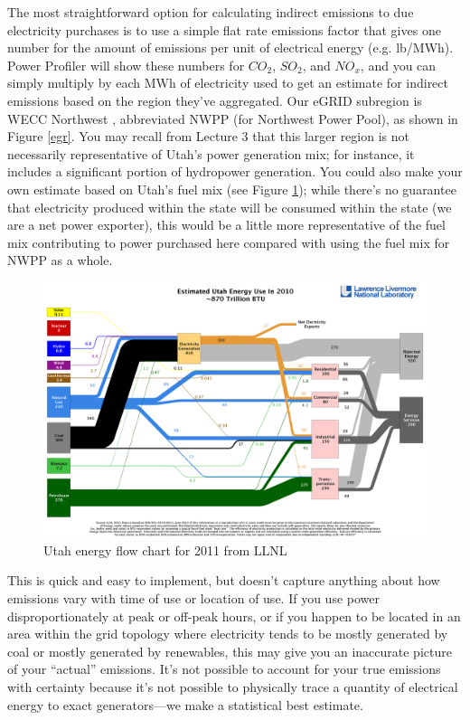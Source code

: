 \documentclass[10pt]{article}
\begin{document}
The most straightforward option for calculating indirect emissions to due electricity purchases is to use a simple flat rate emissions factor that gives one number for the amount of emissions per unit of electrical energy (e.g. lb/MWh). Power Profiler will show these numbers for $CO_2$, $SO_2$, and $NO_x$, and you can simply multiply by each MWh of electricity used to get an estimate for indirect emissions based on the region they've aggregated. Our eGRID subregion is WECC Northwest \cite{eGRIDsupportdoc2016}, abbreviated NWPP (for Northwest Power Pool), as shown in Figure \ref{egr}. You may recall from Lecture 3 that this larger region is not necessarily representative of Utah's power generation mix; for instance, it includes a significant portion of hydropower generation. You could also make your own estimate based on Utah's fuel mix (see Figure \ref{sankeyUT}); while there's no guarantee that electricity produced within the state will be consumed within the state (we are a net power exporter), this would be a little more representative of the fuel mix contributing to power purchased here compared with using the fuel mix for NWPP as a whole.



            \begin{figure}[h]
            \includegraphics[width=6.5in]{extras18/sankey_UT.png}
            \caption{Utah energy flow chart for 2011 from LLNL \cite{noauthor_undated-zv}}
            \label{sankeyUT}
            \end{figure}



This is quick and easy to implement, but doesn't capture anything about how emissions vary with time of use or location of use. If you use power disproportionately at peak or off-peak hours, or if you happen to be located in an area within the grid topology where electricity tends to be mostly generated by coal or mostly generated by renewables, this may give you an inaccurate picture of your ``actual'' emissions. It's not possible to account for your true emissions with certainty because it's not possible to physically trace a quantity of electrical energy to exact generators---we make a statistical best estimate.
\end{document}
